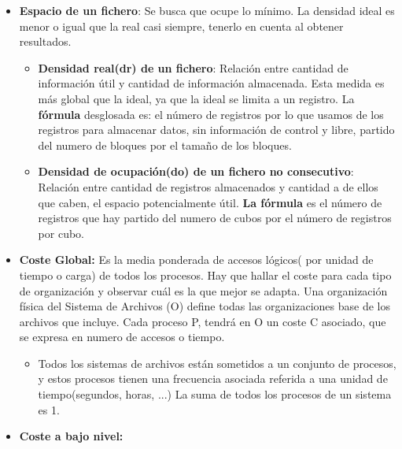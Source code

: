 \documentclass[12pt, twoside, openright]{report} %
\begin{document}
\begin{itemize}
      \begin{itemize}
      \item \textbf{Espacio de un fichero}: Se busca que ocupe lo mínimo. La
        densidad ideal es menor o igual que la real casi siempre,
        tenerlo en cuenta al obtener resultados.
        

        \begin{itemize}
        \item \textbf{Densidad real(dr) de un fichero}: Relación entre
          cantidad de información útil y cantidad de información
          almacenada. Esta medida es más global que la ideal, ya que la
          ideal se limita a un registro. La \textbf{fórmula} desglosada
          es: el número de registros por lo que usamos de los registros
          para almacenar datos, sin información de control y libre,
          partido del numero de bloques por el tamaño de los bloques.
          
        \item \textbf{Densidad de ocupación(do) de un fichero no
          consecutivo}: Relación entre cantidad de registros almacenados
          y cantidad a de ellos que caben, el espacio potencialmente
          útil. \textbf{La fórmula} es el número de registros que hay
          partido del numero de cubos por el número de registros por
          cubo.
          
        \end{itemize}
		\pagebreak
      \item \textbf{Coste Global:} Es la media ponderada de accesos lógicos(
        por unidad de tiempo o carga) de todos los procesos. Hay que
        hallar el coste para cada tipo de organización y observar cuál
        es la que mejor se adapta. Una organización física del Sistema
        de Archivos (O) define todas las organizaciones base de los
        archivos que incluye. Cada proceso P, tendrá en O un coste C
        asociado, que se expresa en numero de accesos o tiempo.
        

        \begin{itemize}
        \item Todos los sistemas de archivos están sometidos a un conjunto
          de procesos, y estos procesos tienen una frecuencia asociada
          referida a una unidad de tiempo(segundos, horas, ...) La suma
          de todos los procesos de un sistema es 1.
          
        \end{itemize}
      \item \textbf{Coste a bajo nivel:}
        


\end{itemize}
\end{itemize}
\end{document}
